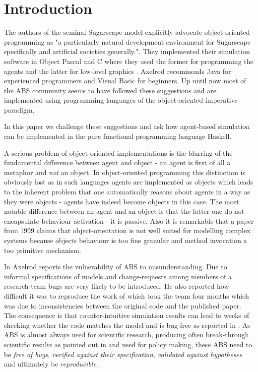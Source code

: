\section{Introduction}


The authors of the seminal Sugarscape model \cite{epstein_growing_1996} explicitly advocate object-oriented programming as "a particularly natural development environment for Sugarscape specifically and artificial societies generally.". They implemented their simulation software in Object Pascal and C where they used the former for programming the agents and the latter for low-level graphics \cite{axtell_aligning_1996}. Axelrod \cite{axelrod_advancing_1997} recommends Java for experienced programmers and Visual Basic for beginners. Up until now most of the ABS community seems to have followed these suggestions and are implemented using programming languages of the object-oriented imperative paradigm.

In this paper we challenge these suggestions and ask how agent-based simulation can be implemented in the pure functional programming language Haskell. 

A serious problem of object-oriented implementations is the blurring of the fundamental difference between agent and object - an agent is first of all a metaphor and \textit{not} an object. In object-oriented programming this distinction is obviously lost as in such languages agents are implemented as objects which leads to the inherent problem that one automatically reasons about agents in a way as they were objects - agents have indeed become objects in this case. The most notable difference between an agent and an object is that the latter one do not encapsulate behaviour activation \cite{jennings_agent-based_2000} - it is passive. Also it is remarkable that \cite{jennings_agent-based_2000} a paper from 1999 claims that object-orientation is not well suited for modelling complex systems because objects behaviour is too fine granular and method invocation a too primitive mechanism.

In \cite{axelrod_chapter_2006} Axelrod reports the vulnerability of ABS to misunderstanding. Due to informal specifications of models and change-requests among members of a research-team bugs are very likely to be introduced. He also reported how difficult it was to reproduce the work of \cite{axelrod_convergence_1995} which took the team four months which was due to inconsistencies between the original code and the published paper. The consequence is that counter-intuitive simulation results can lead to weeks of checking whether the code matches the model and is bug-free as reported in \cite{axelrod_advancing_1997}. As ABS is almost always used for scientific research, producing often break-through scientific results as pointed out in \cite{axelrod_chapter_2006} and used for policy making, these ABS need to be \textit{free of bugs}, \textit{verified against their specification}, \textit{validated against hypotheses} and ultimately be \textit{reproducible}.

